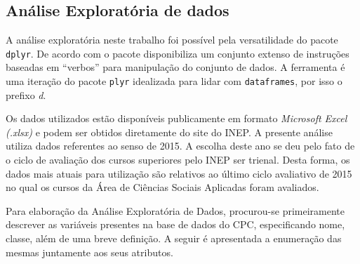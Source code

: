 \subsection{Análise Exploratória de dados}
	A análise exploratória neste trabalho foi possível pela versatilidade do pacote \lstinline{dplyr}\footnotemark. De acordo com  o pacote disponibiliza um conjunto extenso de instruções baseadas em ``verbos'' para manipulação do conjunto de dados. A ferramenta é uma iteração do pacote \lstinline{plyr} idealizada para lidar com \lstinline{dataframes}, por isso o prefixo \textit{d}.

	Os dados utilizados estão disponíveis publicamente em formato \textit{Microsoft Excel (.xlsx)} e podem ser obtidos  diretamente do site do INEP. A presente análise utiliza dados referentes ao senso de 2015. A escolha deste ano se deu pelo fato de o ciclo de avaliação dos cursos superiores pelo INEP ser trienal. Desta forma, os dados mais atuais para utilização são relativos ao último ciclo avaliativo de 2015 no qual os cursos da Área de Ciências Sociais Aplicadas foram avaliados.

	Para elaboração da Análise Exploratória de Dados, procurou-se primeiramente descrever as variáveis presentes na base de dados do CPC, especificando nome, classe, além de uma breve definição. A seguir é apresentada a enumeração das mesmas juntamente aos seus atributos.

